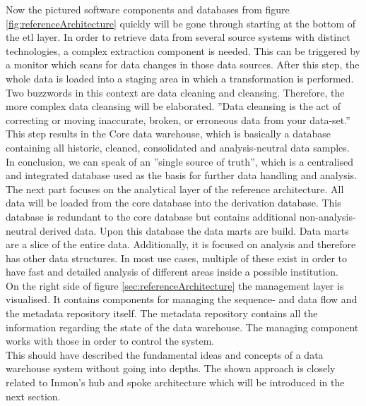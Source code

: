 Now the pictured software components and databases from figure \ref{fig:referenceArchitecture} quickly  will be gone through starting at the bottom of the \acrfull{etl} layer. In order to retrieve data from several source systems with distinct technologies, a complex extraction component is needed. This can be triggered by a monitor which scans for data changes in those data sources.\newline
After this step, the whole data is loaded into a staging area in which a transformation is performed. Two buzzwords in this context are data cleaning and cleansing. Therefore, the more complex data cleansing will be elaborated.
''Data cleansing is the act of correcting or moving inaccurate, broken, or erroneous data from your data-set.'' \cite{dataCleansing}
This step results in the Core data warehouse, which is basically a database containing all historic, cleaned, consolidated and analysis-neutral data samples. In conclusion, we can speak of an ''single source of truth''\cite{scriptRasch}, which is a centralised and integrated database used as the basis for further data handling and analysis.\newline
\\
The next part focuses on the analytical layer of the reference architecture. All data will be loaded from the core database into the derivation database. This database is redundant to the core database but contains additional non-analysis-neutral derived data. Upon this database the data marts are build. Data marts are a slice of the entire data. Additionally, it is focused on analysis and therefore has other data structures. In most use cases, multiple of these exist in order to have fast and detailed analysis of different areas inside a possible institution.\newline
\\
On the right side of figure \ref{sec:referenceArchitecture} the management layer is visualised. It contains components for managing the sequence- and data flow and the metadata repository itself. \newline
The metadata repository contains all the information regarding the state of the data warehouse. The managing component works with those in order to control the system.
\newline
\\
This should have described the fundamental ideas and concepts of a data warehouse system without going into depths. The shown approach is closely related to Inmon's hub and spoke architecture which will be introduced in the next section. 
